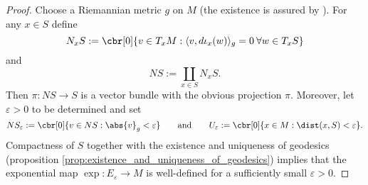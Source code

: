 \begin{proof}
	Choose a Riemannian metric $g$ on $M$ (the existence is assured by \cite[329]{lee:smooth_manifolds:2013}). For any $x \in S$ define
	\begin{equation*}
		N_xS := \cbr[0]{v \in T_xM : \langle v,d\iota_x(w) \rangle_g = 0 \> \forall w \in T_xS}
	\end{equation*}
	\noindent and 
	\begin{equation*}
		NS := \coprod_{x \in S} N_xS.
	\end{equation*}
	Then $\pi : NS \to S$ is a vector bundle with the obvious projection $\pi$. Moreover, let $\varepsilon > 0$ to be determined and set
	\begin{equation*}
		NS_\varepsilon := \cbr[0]{v \in NS : \abs{v}_g < \varepsilon} \qquad \text{and} \qquad U_\varepsilon := \cbr[0]{x \in M : \dist(x,S) < \varepsilon}.
	\end{equation*}
	Compactness of $S$ together with the existence and uniqueness of geodesics (proposition \ref{prop:existence_and_uniqueness_of_geodesics}) implies that the exponential map $\exp : E_\varepsilon \to M$ is well-defined for a sufficiently small $\varepsilon > 0$.
	
\end{proof}
